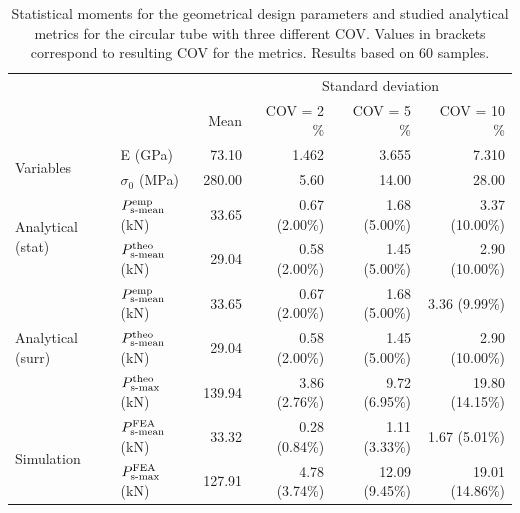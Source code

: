 \documentclass[12pt,number,preprint,review,times]{elsarticle}
\begin{document}
\begin{table}[!htpb]
\begin{center}
\begin{tabular}[t]{llrrrr} \toprule
 & &  &  \multicolumn{3}{c}{Standard deviation}  \\\cmidrule{4-6}
&  & Mean       &    COV = 2 \%  &  COV = 5 \%      &    COV = 10 \%  \\\midrule
\multirow{2}{*}{Variables} & E (GPa)  &  73.10 &  1.462 & 3.655 & 7.310   \\
 & $\sigma_0$ (MPa) &  280.00 & 5.60 & 14.00 & 28.00 \\ \midrule
\multirow{2}{*}{Analytical (stat)} & $P^{\mathrm{emp}}_{\mathrm{s{\text -}mean}}$ (kN) & 33.65  & 0.67 (2.00\%) & 1.68 (5.00\%) & 3.37 (10.00\%)   \\
& $P^{\mathrm{theo}}_{\mathrm{s{\text -}mean}}$ (kN) & 29.04  & 0.58 (2.00\%) & 1.45 (5.00\%) & 2.90 (10.00\%)  \\\midrule
\multirow{3}{*}{Analytical (surr)} & $P^{\mathrm{emp}}_{\mathrm{s{\text -}mean}}$ (kN) & 33.65  & 0.67 (2.00\%) & 1.68 (5.00\%) & 3.36 (9.99\%)    \\
& $P^{\mathrm{theo}}_{\mathrm{s{\text -}mean}}$ (kN) & 29.04  & 0.58 (2.00\%) & 1.45 (5.00\%) & 2.90 (10.00\%)   \\
& $P^{\mathrm{theo}}_{\mathrm{s{\text -}max}}$ (kN) & 139.94  & 3.86 (2.76\%) & 9.72 (6.95\%) & 19.80 (14.15\%) \\ \midrule
\multirow{2}{*}{Simulation} & $P^{\mathrm{FEA}}_{\mathrm{s{\text -}mean}}$ (kN) & 33.32 & 0.28 (0.84\%) & 1.11 (3.33\%) & 1.67 (5.01\%)   \\
& $P^{\mathrm{FEA}}_{\mathrm{s{\text -}max}}$ (kN) & 127.91 & 4.78 (3.74\%) & 12.09 (9.45\%) & 19.01 (14.86\%)  \\
\bottomrule
\end{tabular}
\captionsetup{justification=centering}
\caption{Statistical moments for the geometrical design parameters and studied analytical metrics for the circular tube with three different COV. Values in brackets correspond to resulting COV for the metrics. Results based on 60 samples.}
\label{tab:UQ_sqc2}
\end{center}
\end{table}
\end{document}
